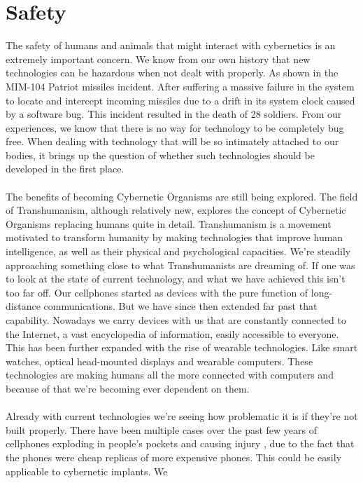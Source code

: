 \documentclass[12pt,a4paper,notitlepage]{article}
\begin{document}
\section{Safety}
The safety of humans and animals that might interact with cybernetics is an
extremely important concern. We know from our own history that new technologies
can be hazardous when not dealt with properly. As shown in the MIM-104 Patriot
missiles incident. After suffering a massive failure in the system to locate and
intercept incoming missiles due to a drift in its system clock caused by a
software bug. This incident resulted in the death of 28 soldiers. From our
experiences, we know that there is no way for technology to be completely bug
free. When dealing with technology that will be so intimately attached to our
bodies, it brings up the question of whether such technologies should be
developed in the first place. 
\\\\
The benefits of becoming Cybernetic Organisms are still being explored. The
field of Transhumanism\cite{Transhumanism}, although relatively new, explores
the concept of Cybernetic Organisms replacing humans quite in detail.
Transhumanism is a movement motivated to transform humanity by making
technologies that improve human intelligence, as well as their physical and
psychological capacities. We're steadily approaching something close to what
Transhumanists are dreaming of. If one was to look at the state of current
technology, and what we have achieved this isn't too far off. Our cellphones
started as devices with the pure function of long-distance communications. But
we have since then extended far past that capability. Nowadays we carry devices
with us that are constantly connected to the Internet, a vast encyclopedia of
information, easily accessible to everyone. This has been further expanded with
the rise of wearable technologies. Like smart watches, optical head-mounted
displays and wearable computers. These technologies are making humans all the
more connected with computers and because of that we're becoming ever dependent
on them.
\\\\
Already with current technologies we're seeing how problematic it is if they're
not built properly. There have been multiple cases over the past few years of
cellphones exploding in people's pockets and causing injury \cite{exploding
cellphone}, due to the fact that the phones were cheap replicas of more
expensive phones. This could be easily applicable to cybernetic implants. We
\end{document}
